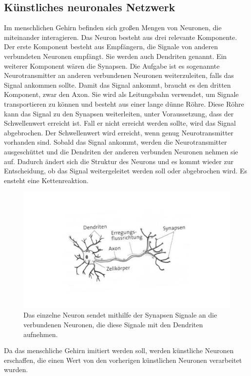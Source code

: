 \documentclass[11pt]{article}
\begin{document}
\subsection{Künstliches neuronales Netzwerk}\label{nn}
Im menschlichen Gehirn befinden sich großen Mengen von Neuronen, die miteinander interagieren. 
Das Neuron besteht aus drei relevante Komponente. Der erste Komponent besteht aus Empfängern, die Signale von anderen verbundeten Neuronen empfängt.
Sie werden auch Dendriten genannt. Ein weiterer Komponent wären die Synapsen. Die Aufgabe ist es sogenannte Neurotransmitter an anderen verbundenen Neuronen
weiterzuleiten, falls das Signal ankommen sollte. Damit das Signal ankommt, braucht es den dritten Komponent, zwar den Axon. Sie wird als Leitungsbahn
verwendet, um Signale transportieren zu können und besteht aus einer lange dünne Röhre. Diese Röhre kann das Signal zu den Synapsen weiterleiten, unter Voraussetzung, dass der Schwellenwert erreicht ist.
Fall er nicht erreicht werden sollte, wird das Signal abgebrochen. Der Schwellenwert wird erreicht, wenn genug Neurotransmitter vorhanden sind.
Sobald das Signal ankommt, werden die Neurotransmitter
ausgeschüttet und die Dendriten der anderen verbunden Neuronen nehmen sie auf.
Dadurch ändert sich die Struktur des Neurons und es kommt wieder zur Entscheidung, ob das Signal weitergeleitet werden soll oder abgebrochen wird.
Es ensteht eine Kettenreaktion.
\begin{figure}[h]
    \centering
    \includegraphics[width=350pt, keepaspectratio]{images/neuron}
    \caption[Aufbau eines Neuron]{Das einzelne Neuron sendet mithilfe der Synapsen Signale an die verbundenen Neuronen, die diese Signale mit den Dendriten aufnehmen.}
\end{figure}
Da das menschliche Gehirn imitiert werden soll, werden künstliche Neuronen erschaffen, die einen Wert von den vorherigen künstlichen Neuronen verarbeitet wurden.
\end{document}
